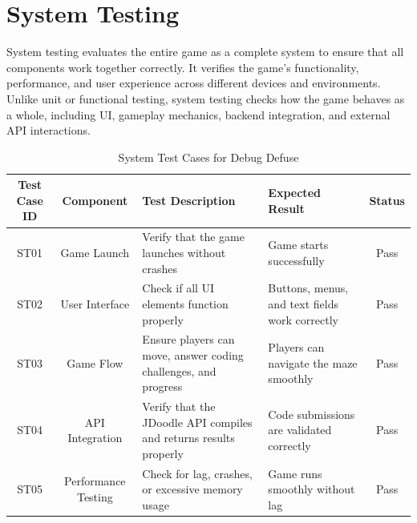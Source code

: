 \section{System Testing}
System testing evaluates the entire game as a complete system to ensure that all components work together correctly. It verifies the game’s functionality, performance, and user experience across different devices and environments. Unlike unit or functional testing, system testing checks how the game behaves as a whole, including UI, gameplay mechanics, backend integration, and external API interactions.\\
\begin{table}[H]
    \centering
    \renewcommand{\arraystretch}{1.3}
    \begin{tabular}{|c|c|p{4cm}|p{3cm}|c|}
        \hline
        \textbf{Test Case ID} & \textbf{Component} & \textbf{Test Description} & \textbf{Expected Result} & \textbf{Status} \\
        \hline
        ST01 & Game Launch & Verify that the game launches without crashes & Game starts successfully & Pass \\
        \hline
        ST02 & User Interface & Check if all UI elements function properly & Buttons, menus, and text fields work correctly & Pass \\
        \hline
        ST03 & Game Flow & Ensure players can move, answer coding challenges, and progress & Players can navigate the maze smoothly & Pass \\
        \hline
        ST04 & API Integration & Verify that the JDoodle API compiles and returns results properly & Code submissions are validated correctly & Pass \\
        \hline
        ST05 & Performance Testing & Check for lag, crashes, or excessive memory usage & Game runs smoothly without lag & Pass \\
        \hline
    \end{tabular}
    \caption{System Test Cases for Debug Defuse}
    \label{tab:system_tests}
\end{table}
\newpage
